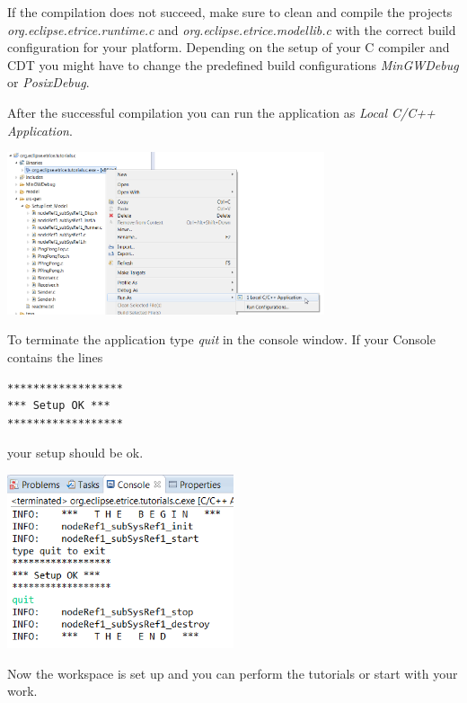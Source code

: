 If the compilation does not succeed, make sure to clean and compile the projects \emph{org.eclipse.etrice.runtime.c} and \emph{org.eclipse.etrice.modellib.c} with the correct build configuration for your platform. Depending on the setup of your C compiler and CDT you might have to change the predefined build configurations \emph{MinGWDebug} or \emph{PosixDebug}.

After the successful compilation you can run the application as \emph{Local C/C++ Application}.

\includegraphics[width=0.7\textwidth]{images/014-08-RunAsC-CPP-Application.png}

To terminate the application type \emph{quit} in the console window. If your Console contains the lines
\begin{verbatim}
******************
*** Setup OK ***
******************
\end{verbatim}
your setup should be ok.

\includegraphics[width=0.5\textwidth]{images/014-09-ConsoleWithSetupOk.png} 

Now the workspace is set up and you can perform the tutorials or start with your work.

